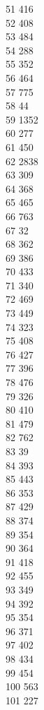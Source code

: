 { 51	416 \\
 52	408 \\
 53	484 \\
 54	288 \\
 55	352 \\
 56	464 \\
 57	775 \\
 58	44 \\
 59	1352 \\
 60	277 \\
 61	450 \\
 62	2838 \\
 63	309 \\
 64	368 \\
 65	465 \\
 66	763 \\
 67	32 \\
 68	362 \\
 69	386 \\
 70	433 \\
 71	340 \\
 72	469 \\
 73	449 \\
 74	323 \\
 75	408 \\
 76	427 \\
 77	396 \\
 78	476 \\
 79	326 \\
 80	410 \\
 81	479 \\
 82	762 \\
 83	39 \\
 84	393 \\
 85	443 \\
 86	353 \\
 87	429 \\
 88	374 \\
 89	354 \\
 90	364 \\
 91	418 \\
 92	455 \\
 93	349 \\
 94	392 \\
 95	354 \\
 96	371 \\
 97	402 \\
 98	434 \\
 99	454 \\
 100	563 \\
 101	227 \\
}
